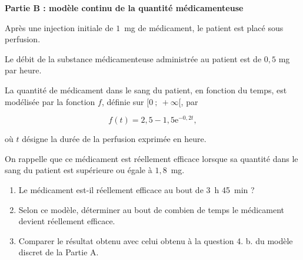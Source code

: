 \bigskip

\textbf{Partie B : modèle continu de la quantité médicamenteuse}

\medskip

Après une injection initiale de $1$~mg de médicament, le patient est placé sous perfusion.

Le débit de la substance médicamenteuse administrée au patient est de $0,5$ mg par heure.

La quantité de médicament dans le sang du patient, en fonction du temps, est modélisée
par la fonction $f$, définie sur $[0~;~ +\infty[$, par 

\[f(t) = 2,5 - 1,5\text{e}^{-0,2t},\]

où $t$ désigne la durée de la perfusion exprimée en heure.

On rappelle que ce médicament est réellement efficace lorsque sa quantité dans le sang du patient est supérieure ou égale à $1,8$~mg.

\medskip

\begin{enumerate}
\item Le médicament est-il réellement efficace au bout de 3~h 45~min ?
\item Selon ce modèle, déterminer au bout de combien de temps le médicament devient réellement efficace.
\item Comparer le résultat obtenu avec celui obtenu à la question 4. b. du modèle discret de la Partie A.
\end{enumerate}

\bigskip
